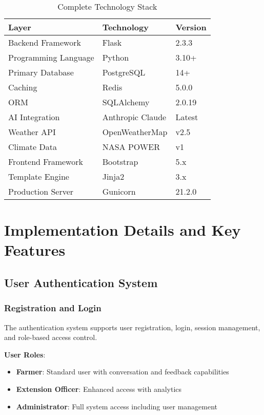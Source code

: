 \documentclass[12pt,a4paper]{article}
\begin{document}
\begin{table}[h]
\centering
\caption{Complete Technology Stack}
\begin{tabular}{|l|l|l|}
\hline
\textbf{Layer} & \textbf{Technology} & \textbf{Version} \\ \hline
Backend Framework & Flask & 2.3.3 \\ \hline
Programming Language & Python & 3.10+ \\ \hline
Primary Database & PostgreSQL & 14+ \\ \hline
Caching & Redis & 5.0.0 \\ \hline
ORM & SQLAlchemy & 2.0.19 \\ \hline
AI Integration & Anthropic Claude & Latest \\ \hline
Weather API & OpenWeatherMap & v2.5 \\ \hline
Climate Data & NASA POWER & v1 \\ \hline
Frontend Framework & Bootstrap & 5.x \\ \hline
Template Engine & Jinja2 & 3.x \\ \hline
Production Server & Gunicorn & 21.2.0 \\ \hline
\end{tabular}
\label{tab:tech-stack}
\end{table}

\section{Implementation Details and Key Features}

\subsection{User Authentication System}

\subsubsection{Registration and Login}

The authentication system supports user registration, login, session management, and role-based access control.

\textbf{User Roles}:
\begin{itemize}[leftmargin=*]
    \item \textbf{Farmer}: Standard user with conversation and feedback capabilities
    \item \textbf{Extension Officer}: Enhanced access with analytics
    \item \textbf{Administrator}: Full system access including user management
\end{itemize}
\end{document}
